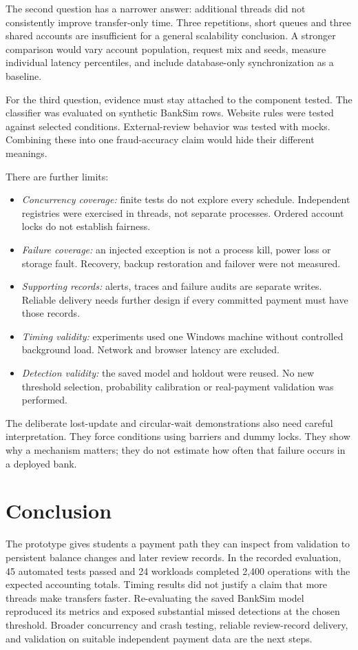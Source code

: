 \documentclass[conference]{IEEEtran}
\begin{document}
The second question has a narrower answer: additional threads did not consistently improve transfer-only time. Three repetitions, short queues and three shared accounts are insufficient for a general scalability conclusion. A stronger comparison would vary account population, request mix and seeds, measure individual latency percentiles, and include database-only synchronization as a baseline.

For the third question, evidence must stay attached to the component tested. The classifier was evaluated on synthetic BankSim rows. Website rules were tested against selected conditions. External-review behavior was tested with mocks. Combining these into one fraud-accuracy claim would hide their different meanings.

There are further limits:
\begin{itemize}
\item \emph{Concurrency coverage:} finite tests do not explore every schedule. Independent registries were exercised in threads, not separate processes. Ordered account locks do not establish fairness.
\item \emph{Failure coverage:} an injected exception is not a process kill, power loss or storage fault. Recovery, backup restoration and failover were not measured.
\item \emph{Supporting records:} alerts, traces and failure audits are separate writes. Reliable delivery needs further design if every committed payment must have those records.
\item \emph{Timing validity:} experiments used one Windows machine without controlled background load. Network and browser latency are excluded.
\item \emph{Detection validity:} the saved model and holdout were reused. No new threshold selection, probability calibration or real-payment validation was performed.
\end{itemize}

The deliberate lost-update and circular-wait demonstrations also need careful interpretation. They force conditions using barriers and dummy locks. They show why a mechanism matters; they do not estimate how often that failure occurs in a deployed bank.

\section{Conclusion}
The prototype gives students a payment path they can inspect from validation to persistent balance changes and later review records. In the recorded evaluation, 45 automated tests passed and 24 workloads completed 2,400 operations with the expected accounting totals. Timing results did not justify a claim that more threads make transfers faster. Re-evaluating the saved BankSim model reproduced its metrics and exposed substantial missed detections at the chosen threshold. Broader concurrency and crash testing, reliable review-record delivery, and validation on suitable independent payment data are the next steps.
\end{document}
